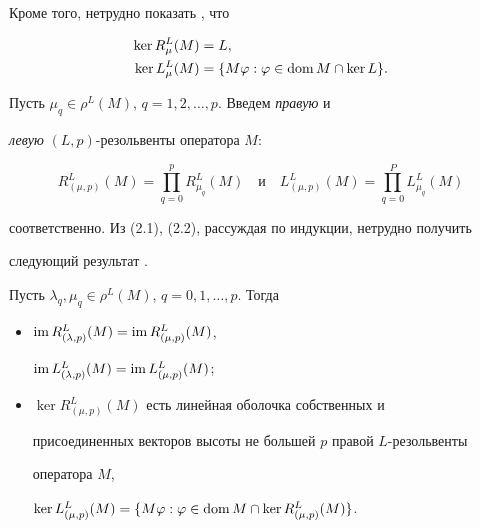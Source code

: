 Кроме того, нетрудно показать \cite{Sv5}, что 


\begin{align} 


\begin{split} 


\ker R^L_\mu(M) &=L,\\ 


\ker L^L_\mu(M) &=\{M\varphi:\varphi\in\dom M\cap\ker L\}. 


\end{split} 


\end{align} 


 


Пусть $\mu_q\in\rho^L(M)$, $q=1,2,\dotsc,p$. Введем {\it правую} и 


{\it левую} $(L,p)$-резольвенты оператора $M$: 


$$ 


R^L_{(\mu,p)}(M)=\prod^p_{q=0}R^L_{\mu_q}(M)\quad\text{и}\quad 


L^L_{(\mu,p)}(M)=\prod^P_{q=0}L^L_{\mu_q}(M) 


$$ 


соответственно. Из (2.1), (2.2), рассуждая по индукции, нетрудно получить 


следующий результат \cite{Sv5}. 


 


\begin{lemm} Пусть $\lambda_q,\mu_q\in\rho^L(M)$, $q=0,1,\dotsc,p$. Тогда 


\begin{itemize} 


\item[(i)] $\operatorname{im} R^L_{(\lambda,p)}(M)=\operatorname{im} R^L_{(\mu,p)}(M)$, 


$\operatorname{im} L^L_{(\lambda,p)}(M)=\operatorname{im} L^L_{(\mu,p)}(M)$; 


\item[(ii)] $\ker R^L_{(\mu,p)}(M)$ есть линейная оболочка собственных и 


присоединенных векторов высоты не большей $p$ правой $L$-резольвенты 


оператора $M$, 


$\ker L^L_{(\mu,p)}(M)=\{M\varphi:\varphi\in\dom M\cap 


\ker R^L_{(\mu,p)}(M)\}$. 


\end{itemize}


\end{lemm} 


